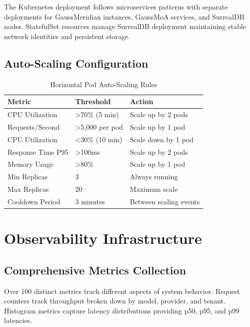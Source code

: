 \documentclass[12pt,a4paper,twoside]{report}
\begin{document}
\clearpage

The Kubernetes deployment follows microservices patterns with separate deployments for GaussMeridian instances, GaussMoA services, and SurrealDB nodes. StatefulSet resources manage SurrealDB deployment maintaining stable network identities and persistent storage.

\subsection{Auto-Scaling Configuration}

\begin{table}[h]
\centering
\begin{tabular}{@{}p{4cm}p{3cm}p{4.5cm}@{}}
\toprule
\textbf{Metric} & \textbf{Threshold} & \textbf{Action} \\
\midrule
CPU Utilization & >70\% (5 min) & Scale up by 2 pods \\
Requests/Second & >5,000 per pod & Scale up by 1 pod \\
CPU Utilization & <30\% (10 min) & Scale down by 1 pod \\
Response Time P95 & >100ms & Scale up by 2 pods \\
Memory Usage & >80\% & Scale up by 1 pod \\
\midrule
Min Replicas & 3 & Always running \\
Max Replicas & 20 & Maximum scale \\
Cooldown Period & 3 minutes & Between scaling events \\
\bottomrule
\end{tabular}
\caption{Horizontal Pod Auto-Scaling Rules}
\label{tab:autoscaling}
\end{table}

\section{Observability Infrastructure}

\subsection{Comprehensive Metrics Collection}

Over 100 distinct metrics track different aspects of system behavior. Request counters track throughput broken down by model, provider, and tenant. Histogram metrics capture latency distributions providing p50, p95, and p99 latencies.
\end{document}
